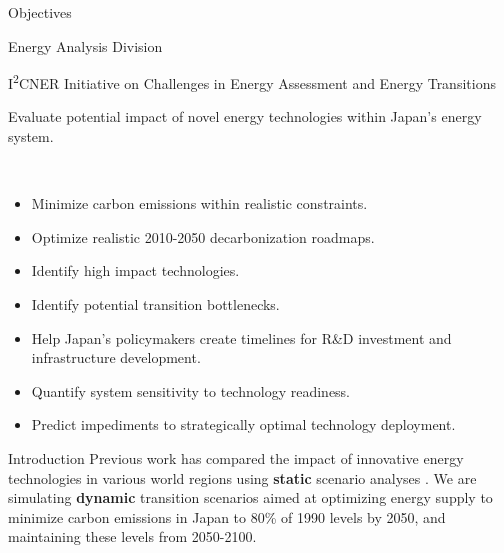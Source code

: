 \documentclass[final]{beamer}
\newlength{\onecolwid}
\newlength{\twocolwid}
\newlength{\threecolwid}
\begin{document}
\begin{frame}[t]
\begin{columns}[t,totalwidth=\threecolwid]
\begin{column}{\twocolwid}
\begin{columns}[t,totalwidth=\twocolwid]
\begin{column}{\onecolwid}
\begin{alertblock}{Objectives}
\begin{description}
{\large 
        \item[\textbf{Division:}] Energy Analysis Division
        \item[\textbf{Project:}] I\textsuperscript{2}CNER Initiative on Challenges in Energy Assessment and Energy Transitions
        \item[\textbf{Objective:}] Evaluate potential impact of novel energy technologies within Japan's energy system.
\item[\textbf{Milestones:}] ~\\}
        \begin{itemize}
        \item Minimize carbon emissions within realistic constraints.
        \item Optimize realistic 2010-2050 decarbonization roadmaps.
	\item Identify high impact technologies.
        \item Identify potential transition bottlenecks.
        \item Help Japan's policymakers create timelines for R\&D investment and infrastructure development.
        \item Quantify system sensitivity to technology readiness.
	\item Predict impediments to strategically optimal technology deployment.
	\end{itemize}
\end{description}

\end{alertblock}
%
%


\begin{block}{Introduction}
Previous work has compared the impact of innovative energy technologies in 
various world regions using \textbf{static} scenario analyses 
\cite{kikuchi_simulation-based_2017,pambudi_impact_2017}.  
We are simulating \textbf{dynamic} transition scenarios 
\cite{pfenninger_energy_2014} aimed at optimizing energy supply to minimize carbon 
emissions in Japan to 80\% of 1990 levels by 2050, and maintaining these levels from 2050-2100. \\


\end{block}
\end{column}
\end{columns}
\end{column}
\end{columns}
\end{frame}
\end{document}

